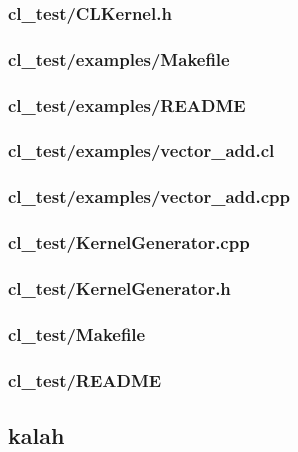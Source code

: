 \documentclass{article}
\begin{document}
\subsubsection*{cl\_test/CLKernel.h}


\subsubsection*{cl\_test/examples/Makefile}


\subsubsection*{cl\_test/examples/README}


\subsubsection*{cl\_test/examples/vector\_add.cl}


\subsubsection*{cl\_test/examples/vector\_add.cpp}


\subsubsection*{cl\_test/KernelGenerator.cpp}


\subsubsection*{cl\_test/KernelGenerator.h}


\subsubsection*{cl\_test/Makefile}


\subsubsection*{cl\_test/README}


\subsection*{kalah}
\end{document}
